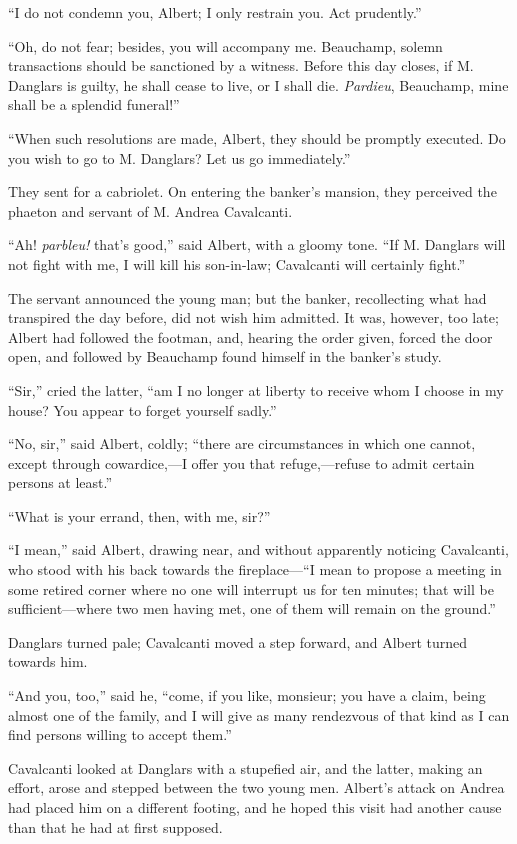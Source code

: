 “I do not condemn you, Albert; I only restrain you. Act prudently.”

“Oh, do not fear; besides, you will accompany me. Beauchamp, solemn
transactions should be sanctioned by a witness. Before this day closes,
if M. Danglars is guilty, he shall cease to live, or I shall die.
\textit{Pardieu}, Beauchamp, mine shall be a splendid funeral!”

“When such resolutions are made, Albert, they should be promptly
executed. Do you wish to go to M. Danglars? Let us go immediately.”

They sent for a cabriolet. On entering the banker’s mansion, they
perceived the phaeton and servant of M. Andrea Cavalcanti.

“Ah! \textit{parbleu!} that’s good,” said Albert, with a gloomy tone. “If M.
Danglars will not fight with me, I will kill his son-in-law; Cavalcanti
will certainly fight.”

The servant announced the young man; but the banker, recollecting what
had transpired the day before, did not wish him admitted. It was,
however, too late; Albert had followed the footman, and, hearing the
order given, forced the door open, and followed by Beauchamp found
himself in the banker’s study.

“Sir,” cried the latter, “am I no longer at liberty to receive whom I
choose in my house? You appear to forget yourself sadly.”

“No, sir,” said Albert, coldly; “there are circumstances in which one
cannot, except through cowardice,—I offer you that refuge,—refuse to
admit certain persons at least.”

“What is your errand, then, with me, sir?”

“I mean,” said Albert, drawing near, and without apparently noticing
Cavalcanti, who stood with his back towards the fireplace—“I mean to
propose a meeting in some retired corner where no one will interrupt us
for ten minutes; that will be sufficient—where two men having met, one
of them will remain on the ground.”

Danglars turned pale; Cavalcanti moved a step forward, and Albert
turned towards him.

“And you, too,” said he, “come, if you like, monsieur; you have a
claim, being almost one of the family, and I will give as many
rendezvous of that kind as I can find persons willing to accept them.”

Cavalcanti looked at Danglars with a stupefied air, and the latter,
making an effort, arose and stepped between the two young men. Albert’s
attack on Andrea had placed him on a different footing, and he hoped
this visit had another cause than that he had at first supposed.

